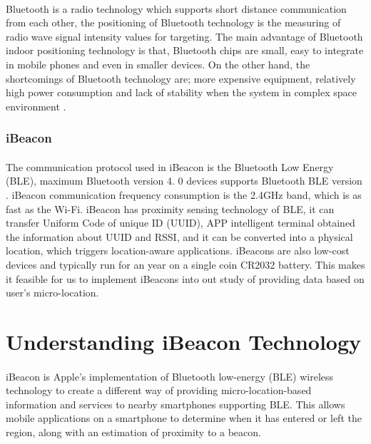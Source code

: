 \documentclass[12pt]{article}
\begin{document}
\paragraph{}Bluetooth is a radio technology which supports short distance communication from each other, the positioning of Bluetooth technology is the measuring of radio wave signal intensity values for targeting. The main advantage of Bluetooth indoor positioning technology is that, Bluetooth chips are small, easy to integrate in mobile phones and even in smaller devices. On the other hand, the shortcomings of Bluetooth technology are; more expensive equipment, relatively high power consumption and lack of stability when the system in complex space environment \cite{indoor}.

\subsubsection{iBeacon}
\paragraph{}The communication protocol used in iBeacon is the Bluetooth Low Energy (BLE), maximum Bluetooth version 4. 0 devices supports Bluetooth BLE version \cite{indoor}. iBeacon communication frequency consumption is the 2.4GHz band, which is as fast as the Wi-Fi. iBeacon has proximity sensing technology of BLE, it can transfer Uniform Code of unique ID (UUID), APP intelligent terminal obtained the information about UUID and RSSI, and it can be converted into a physical location, which triggers location-aware applications. iBeacons are also low-cost devices and typically run for an year on a single coin CR2032 battery. This makes it feasible for us to implement iBeacons into out study of providing data based on user's micro-location.

\section{Understanding iBeacon Technology}
\label{iBeacon-tech}
\paragraph{}iBeacon is Apple’s implementation of Bluetooth low-energy (BLE) wireless technology to create a different way of providing micro-location-based information and services to nearby smartphones supporting BLE. This allows mobile applications on a smartphone to determine when it has entered or left the region, along with an estimation of proximity to a beacon. \\
\end{document}
